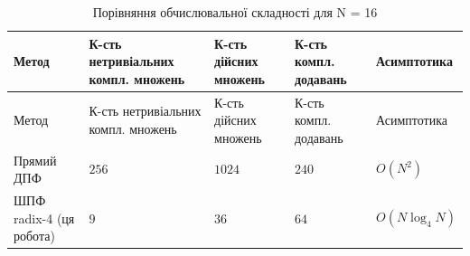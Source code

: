 \documentclass[
]{article}
\begin{document}
\begin{longtable}[]{@{}
  >{\raggedright\arraybackslash}p{}
  >{\raggedright\arraybackslash}p{}
  >{\raggedright\arraybackslash}p{}
  >{\raggedright\arraybackslash}p{}
  >{\raggedright\arraybackslash}p{}@{}}
\caption[Порівняння обчислювальної складності для N = 16]{Порівняння
обчислювальної складності для N = 16}\tabularnewline
\toprule\noalign{}
\begin{minipage}[b]{\linewidth}\raggedright
Метод
\end{minipage} & \begin{minipage}[b]{\linewidth}\raggedright
К-сть нетривіальних компл. множень
\end{minipage} & \begin{minipage}[b]{\linewidth}\raggedright
К-сть дійсних множень
\end{minipage} & \begin{minipage}[b]{\linewidth}\raggedright
К-сть компл. додавань
\end{minipage} & \begin{minipage}[b]{\linewidth}\raggedright
Асимптотика
\end{minipage} \\
\midrule\noalign{}
\endfirsthead
\toprule\noalign{}
\begin{minipage}[b]{\linewidth}\raggedright
Метод
\end{minipage} & \begin{minipage}[b]{\linewidth}\raggedright
К-сть нетривіальних компл. множень
\end{minipage} & \begin{minipage}[b]{\linewidth}\raggedright
К-сть дійсних множень
\end{minipage} & \begin{minipage}[b]{\linewidth}\raggedright
К-сть компл. додавань
\end{minipage} & \begin{minipage}[b]{\linewidth}\raggedright
Асимптотика
\end{minipage} \\
\midrule\noalign{}
\endhead
\bottomrule\noalign{}
\endlastfoot
Прямий ДПФ & \(256\) & \(1024\) & \(240\) & \(O(N^{2})\) \\
ШПФ radix-4 (ця робота) & \(9\) & \(36\) & \(64\) & \(O(N\log_{4}N)\) \\
\end{longtable}
\end{document}
